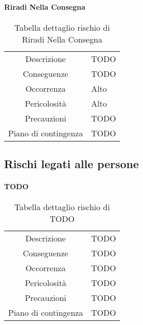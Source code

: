 \paragraph{Riradi Nella Consegna}
\renewcommand{\arraystretch}{1}
    \begin{table}[H]
        \begin{center}
            \setlength{\aboverulesep}{0pt}
            \setlength{\belowrulesep}{0pt}
            \setlength{\extrarowheight}{.75ex}
            \begin{tabular}{ c p{10cm} }
                \rowcolor{AzzurroGruppo!30} 
                \toprule
                Descrizione & TODO \\
                Conseguenze & TODO \\
                Occorrenza & Alto \\
                Pericolosità & Alto \\
                Precauzioni & TODO \\
                Piano di contingenza & TODO \\
                \bottomrule
            \end{tabular}
            \caption{Tabella dettaglio rischio di Riradi Nella Consegna}
        \end{center}
    \end{table}

\subsection{Rischi legati alle persone}

\paragraph{TODO}
\renewcommand{\arraystretch}{1}
    \begin{table}[H]
        \begin{center}
            \setlength{\aboverulesep}{0pt}
            \setlength{\belowrulesep}{0pt}
            \setlength{\extrarowheight}{.75ex}
            \begin{tabular}{ c p{10cm} }
                \rowcolor{AzzurroGruppo!30} 
                \toprule
                Descrizione & TODO \\
                Conseguenze & TODO \\
                Occorrenza & TODO \\
                Pericolosità & TODO \\
                Precauzioni & TODO \\
                Piano di contingenza & TODO \\
                \bottomrule
            \end{tabular}
            \caption{Tabella dettaglio rischio di TODO}
        \end{center}
    \end{table}